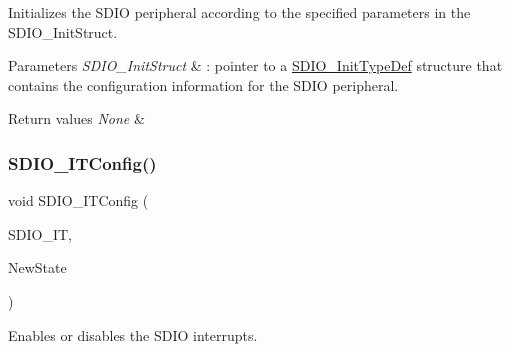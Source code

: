 Initializes the S\+D\+IO peripheral according to the specified parameters in the S\+D\+I\+O\+\_\+\+Init\+Struct. 


\begin{DoxyParams}{Parameters}
{\em S\+D\+I\+O\+\_\+\+Init\+Struct} & \+: pointer to a \mbox{\hyperlink{struct_s_d_i_o___init_type_def}{S\+D\+I\+O\+\_\+\+Init\+Type\+Def}} structure that contains the configuration information for the S\+D\+IO peripheral. \\
\hline
\end{DoxyParams}

\begin{DoxyRetVals}{Return values}
{\em None} & \\
\hline
\end{DoxyRetVals}
\mbox{\label{group___s_d_i_o___private___functions_ga208f51237ef43288735829dbaed37f00}} 
\subsubsection{\texorpdfstring{SDIO\_ITConfig()}{SDIO\_ITConfig()}}
{\footnotesize\ttfamily void S\+D\+I\+O\+\_\+\+I\+T\+Config (\begin{DoxyParamCaption}\item[{uint32\+\_\+t}]{S\+D\+I\+O\+\_\+\+IT,  }\item[{\mbox{\hyperlink{group___exported__types_gac9a7e9a35d2513ec15c3b537aaa4fba1}{Functional\+State}}}]{New\+State }\end{DoxyParamCaption})}



Enables or disables the S\+D\+IO interrupts. 


